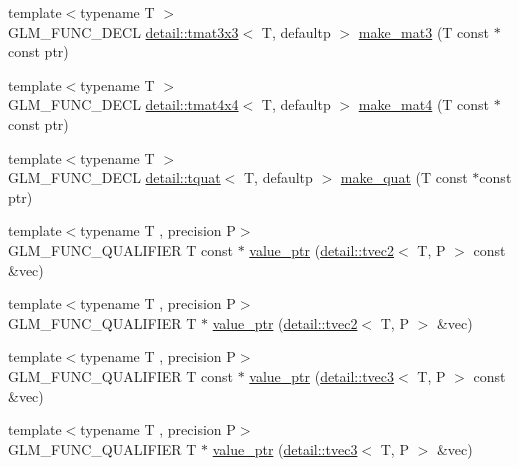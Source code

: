 \begin{DoxyCompactItemize}
{\footnotesize template$<$typename T $>$ }\\G\+L\+M\+\_\+\+F\+U\+N\+C\+\_\+\+D\+E\+CL \hyperlink{structglm_1_1detail_1_1tmat3x3}{detail\+::tmat3x3}$<$ T, defaultp $>$ \hyperlink{group__gtc__type__ptr_gae50ecac46eb8771fb074e310b602bf53}{make\+\_\+mat3} (T const $\ast$const ptr)
\item 
{\footnotesize template$<$typename T $>$ }\\G\+L\+M\+\_\+\+F\+U\+N\+C\+\_\+\+D\+E\+CL \hyperlink{structglm_1_1detail_1_1tmat4x4}{detail\+::tmat4x4}$<$ T, defaultp $>$ \hyperlink{group__gtc__type__ptr_gac3920fd61f0c459a4749b8eb9107982c}{make\+\_\+mat4} (T const $\ast$const ptr)
\item 
{\footnotesize template$<$typename T $>$ }\\G\+L\+M\+\_\+\+F\+U\+N\+C\+\_\+\+D\+E\+CL \hyperlink{structglm_1_1detail_1_1tquat}{detail\+::tquat}$<$ T, defaultp $>$ \hyperlink{group__gtc__type__ptr_ga051ec24a44af31a08b11eccbf8726b02}{make\+\_\+quat} (T const $\ast$const ptr)
\item 
{\footnotesize template$<$typename T , precision P$>$ }\\G\+L\+M\+\_\+\+F\+U\+N\+C\+\_\+\+Q\+U\+A\+L\+I\+F\+I\+ER T const $\ast$ \hyperlink{group__gtc__type__ptr_gac57a976f59e794e6406ecf2924a18f4e}{value\+\_\+ptr} (\hyperlink{structglm_1_1detail_1_1tvec2}{detail\+::tvec2}$<$ T, P $>$ const \&vec)
\item 
{\footnotesize template$<$typename T , precision P$>$ }\\G\+L\+M\+\_\+\+F\+U\+N\+C\+\_\+\+Q\+U\+A\+L\+I\+F\+I\+ER T $\ast$ \hyperlink{group__gtc__type__ptr_gac2a64387090621acf7176b63f31b70a2}{value\+\_\+ptr} (\hyperlink{structglm_1_1detail_1_1tvec2}{detail\+::tvec2}$<$ T, P $>$ \&vec)
\item 
{\footnotesize template$<$typename T , precision P$>$ }\\G\+L\+M\+\_\+\+F\+U\+N\+C\+\_\+\+Q\+U\+A\+L\+I\+F\+I\+ER T const $\ast$ \hyperlink{group__gtc__type__ptr_ga676a0ba6f4b7cd817fe6d16cb3113857}{value\+\_\+ptr} (\hyperlink{structglm_1_1detail_1_1tvec3}{detail\+::tvec3}$<$ T, P $>$ const \&vec)
\item 
{\footnotesize template$<$typename T , precision P$>$ }\\G\+L\+M\+\_\+\+F\+U\+N\+C\+\_\+\+Q\+U\+A\+L\+I\+F\+I\+ER T $\ast$ \hyperlink{group__gtc__type__ptr_ga4babc9956e32bbd0769bc20ab2d73800}{value\+\_\+ptr} (\hyperlink{structglm_1_1detail_1_1tvec3}{detail\+::tvec3}$<$ T, P $>$ \&vec)
\item 

\end{DoxyCompactItemize}
